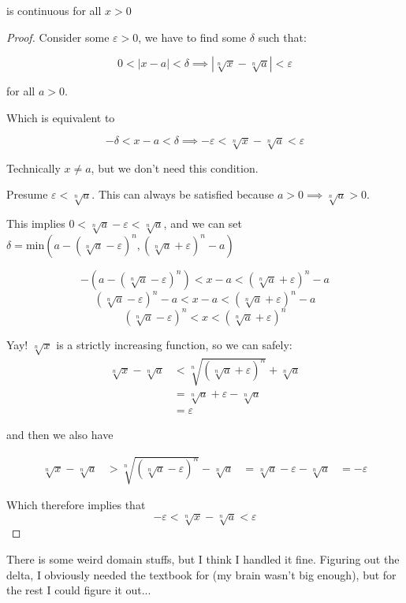 is continuous for all $x > 0$
\begin{proof}
Consider some $\varepsilon > 0$, we have to find some $\delta$ such that:

\[0 < |x - a| < \delta \implies |\sqrt[n]{x} - \sqrt[n]{a}| < \varepsilon\]

for all $a > 0$.

Which is equivalent to 

\[-\delta < x - a < \delta \implies -\varepsilon < \sqrt[n]{x} - \sqrt[n]{a} < \varepsilon\]

Technically $x \neq a$, but we don't need this condition.

Presume $\varepsilon < \sqrt[n]{a}$. This can always be satisfied because $a > 0 \implies \sqrt[n]{a} > 0$.

This implies $0 < \sqrt[n]{a} - \varepsilon < \sqrt[n]{a}$, and we can set $\delta = \text{min}(a - (\sqrt[n]{a} - \varepsilon)^n, (\sqrt[n]{a} + \varepsilon)^n - a)$

\[-(a - (\sqrt[n]{a} - \varepsilon)^n) < x - a < (\sqrt[n]{a} + \varepsilon)^n - a\]
\[(\sqrt[n]{a} - \varepsilon)^n - a < x - a < (\sqrt[n]{a} + \varepsilon)^n - a\]
\[(\sqrt[n]{a} - \varepsilon)^n < x < (\sqrt[n]{a} + \varepsilon)^n\]

Yay! $\sqrt[n]{x}$ is a strictly increasing function, so we can safely:
\begin{align}
\sqrt[n]{x} - \sqrt[n]{a} &< \sqrt[n]{(\sqrt[n]{a} + \varepsilon)^n} + \sqrt[n]{a} \\
&= \sqrt[n]{a} + \varepsilon - \sqrt[n]{a} \\
&= \varepsilon
\end{align}

and then we also have

\begin{align}
\sqrt[n]{x} - \sqrt[n]{a} &> \sqrt[n]{(\sqrt[n]{a} - \varepsilon)^n} - \sqrt[n]{a}
&= \sqrt[n]{a} - \varepsilon - \sqrt[n]{a}
&= -\varepsilon
\end{align}

Which therefore implies that
\[-\varepsilon < \sqrt[n]{x} - \sqrt[n]{a} < \varepsilon\]
\end{proof}
There is some weird domain stuffs, but I think I handled it fine. Figuring out the delta, I obviously needed the textbook for (my brain wasn't big enough), but for the rest I could figure it out...



